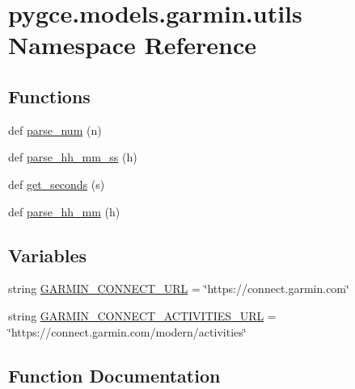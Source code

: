 \hypertarget{namespacepygce_1_1models_1_1garmin_1_1utils}{}\section{pygce.\+models.\+garmin.\+utils Namespace Reference}
\label{namespacepygce_1_1models_1_1garmin_1_1utils}
\subsection*{Functions}
\begin{DoxyCompactItemize}
\item 
def \hyperlink{namespacepygce_1_1models_1_1garmin_1_1utils_aea0d8725a78fd92ca64024c3c1c0c184}{parse\+\_\+num} (n)
\item 
def \hyperlink{namespacepygce_1_1models_1_1garmin_1_1utils_ac75c05f5427172ce319c6ff155399b17}{parse\+\_\+hh\+\_\+mm\+\_\+ss} (h)
\item 
def \hyperlink{namespacepygce_1_1models_1_1garmin_1_1utils_a8505cf82cbca1a0f001e062b09a82581}{get\+\_\+seconds} (s)
\item 
def \hyperlink{namespacepygce_1_1models_1_1garmin_1_1utils_a53d4c33bdb7653260d28ee934c8e35fe}{parse\+\_\+hh\+\_\+mm} (h)
\end{DoxyCompactItemize}
\subsection*{Variables}
\begin{DoxyCompactItemize}
\item 
string \hyperlink{namespacepygce_1_1models_1_1garmin_1_1utils_a68b54ed8a5dee0f2fdb43d107f19699f}{G\+A\+R\+M\+I\+N\+\_\+\+C\+O\+N\+N\+E\+C\+T\+\_\+\+U\+RL} = \char`\"{}https\+://connect.\+garmin.\+com\char`\"{}
\item 
string \hyperlink{namespacepygce_1_1models_1_1garmin_1_1utils_a147f822f3288cb74ff6012414e346e6f}{G\+A\+R\+M\+I\+N\+\_\+\+C\+O\+N\+N\+E\+C\+T\+\_\+\+A\+C\+T\+I\+V\+I\+T\+I\+E\+S\+\_\+\+U\+RL} = \char`\"{}https\+://connect.\+garmin.\+com/modern/activities\char`\"{}
\end{DoxyCompactItemize}


\subsection{Function Documentation}
